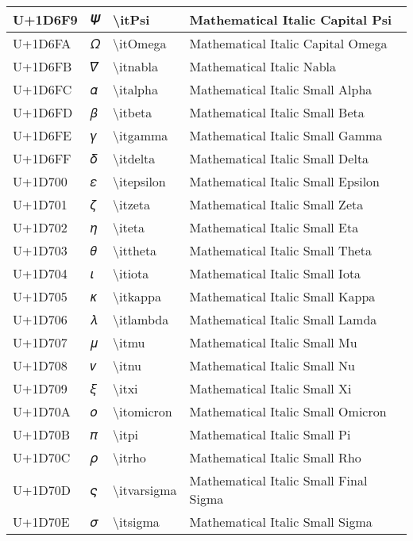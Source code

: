 \begin{table}[h]
\begin{tabulary}{\linewidth}{|L|L|L|L|}
\hline
U+1D6F9 & 𝛹 & {\textbackslash}itPsi & Mathematical Italic Capital Psi \\
\hline
U+1D6FA & 𝛺 & {\textbackslash}itOmega & Mathematical Italic Capital Omega \\
\hline
U+1D6FB & 𝛻 & {\textbackslash}itnabla & Mathematical Italic Nabla \\
\hline
U+1D6FC & 𝛼 & {\textbackslash}italpha & Mathematical Italic Small Alpha \\
\hline
U+1D6FD & 𝛽 & {\textbackslash}itbeta & Mathematical Italic Small Beta \\
\hline
U+1D6FE & 𝛾 & {\textbackslash}itgamma & Mathematical Italic Small Gamma \\
\hline
U+1D6FF & 𝛿 & {\textbackslash}itdelta & Mathematical Italic Small Delta \\
\hline
U+1D700 & 𝜀 & {\textbackslash}itepsilon & Mathematical Italic Small Epsilon \\
\hline
U+1D701 & 𝜁 & {\textbackslash}itzeta & Mathematical Italic Small Zeta \\
\hline
U+1D702 & 𝜂 & {\textbackslash}iteta & Mathematical Italic Small Eta \\
\hline
U+1D703 & 𝜃 & {\textbackslash}ittheta & Mathematical Italic Small Theta \\
\hline
U+1D704 & 𝜄 & {\textbackslash}itiota & Mathematical Italic Small Iota \\
\hline
U+1D705 & 𝜅 & {\textbackslash}itkappa & Mathematical Italic Small Kappa \\
\hline
U+1D706 & 𝜆 & {\textbackslash}itlambda & Mathematical Italic Small Lamda \\
\hline
U+1D707 & 𝜇 & {\textbackslash}itmu & Mathematical Italic Small Mu \\
\hline
U+1D708 & 𝜈 & {\textbackslash}itnu & Mathematical Italic Small Nu \\
\hline
U+1D709 & 𝜉 & {\textbackslash}itxi & Mathematical Italic Small Xi \\
\hline
U+1D70A & 𝜊 & {\textbackslash}itomicron & Mathematical Italic Small Omicron \\
\hline
U+1D70B & 𝜋 & {\textbackslash}itpi & Mathematical Italic Small Pi \\
\hline
U+1D70C & 𝜌 & {\textbackslash}itrho & Mathematical Italic Small Rho \\
\hline
U+1D70D & 𝜍 & {\textbackslash}itvarsigma & Mathematical Italic Small Final Sigma \\
\hline
U+1D70E & 𝜎 & {\textbackslash}itsigma & Mathematical Italic Small Sigma \\

\end{tabulary}
\end{table}
